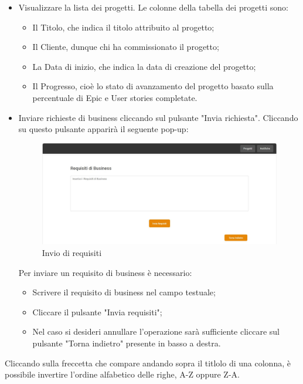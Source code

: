 \documentclass{article}
\begin{document}
\begin{itemize}
    \item Visualizzare la lista dei progetti. Le colonne della tabella dei progetti sono:
    \begin{itemize}
        \item Il Titolo, che indica il titolo attribuito al progetto;
        \item Il Cliente, dunque chi ha commissionato il progetto;
        \item La Data di inizio, che indica la data di creazione del progetto;
        \item Il Progresso, cioè lo stato di avanzamento del progetto basato sulla percentuale di Epic e User stories completate.
    \end{itemize}
    \item Inviare richieste di business cliccando sul pulsante "Invia richiesta". Cliccando su questo pulsante apparirà il seguente pop-up:
     \begin{figure}[H]
    \centering
      \includegraphics[width=\textwidth]{documenti/Screenshot manuale utente/invio requisiti cliente.jpeg}
      \caption{Invio di requisiti}
      \label{req}
    \end{figure} 
    Per inviare un requisito di business è necessario:
    \begin{itemize}
        \item Scrivere il requisito di business nel campo testuale;
        \item Cliccare il pulsante "Invia requisiti";
        \item Nel caso si desideri annullare l'operazione sarà sufficiente cliccare sul pulsante "Torna indietro" presente in basso a destra. 
    \end{itemize}
    \end{itemize}
    Cliccando sulla freccetta che compare andando sopra il titlolo di una colonna, è possibile invertire l'ordine alfabetico delle righe, A-Z oppure Z-A.
\end{document}
